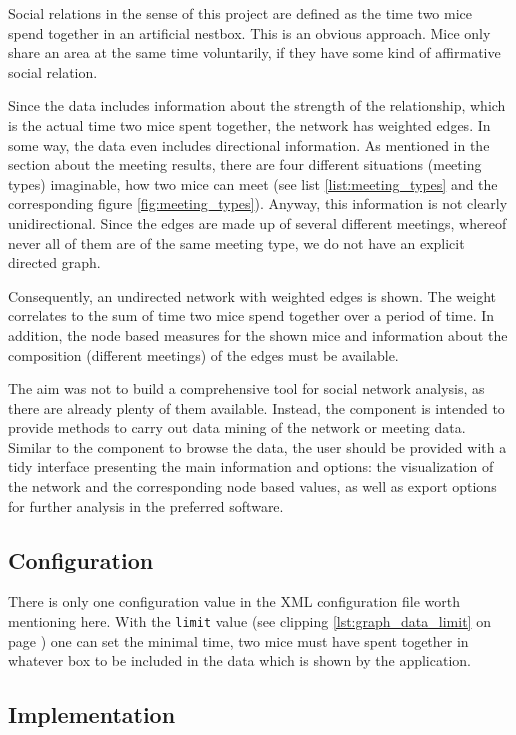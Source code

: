 Social relations in the sense of this project are defined as the time two mice spend together in an artificial nestbox. This is an obvious approach. Mice only share an area at the same time voluntarily, if they have some kind of affirmative social relation.

Since the data includes information about the strength of the relationship, which is the actual time two mice spent together, the network has weighted edges. In some way, the data even includes directional information. As mentioned in the section about the meeting results, there are four different situations (meeting types) imaginable, how two mice can meet (see list \ref{list:meeting_types} and the corresponding figure \ref{fig:meeting_types}). Anyway, this information is not clearly unidirectional. Since the edges are made up of several different meetings, whereof never all of them are of the same meeting type, we do not have an explicit directed graph.

Consequently, an undirected network with weighted edges is shown. The weight correlates to the sum of time two mice spend together over a period of time. In addition, the node based measures for the shown mice and information about the composition (different meetings) of the edges must be available.

The aim was not to build a comprehensive tool for social network analysis, as there are already plenty of them available. Instead, the component is intended to provide methods to carry out data mining of the network or meeting data. Similar to the component to browse the data, the user should be provided with a tidy interface presenting the main information and options: the visualization of the network and the corresponding node based values, as well as export options for further analysis in the preferred software.

\subsection{Configuration}
\label{subsec:graph_config}

There is only one configuration value in the XML configuration file worth mentioning here. With the \lstinline|limit| value (see clipping \ref{lst:graph_data_limit} on page \pageref{lst:graph_data_limit}) one can set the minimal time, two mice must have spent together in whatever box to be included in the data which is shown by the application. 

\subsection{Implementation}
\label{subsec:graph_explore}

